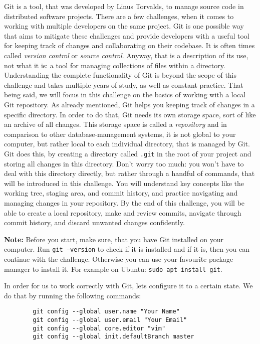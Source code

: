 \begin{challenge}
    \begin{chadescription}
    Git is a tool, that was developed by Linus Torvalds, to manage source code in distributed software projects.
    There are a few challenges, when it comes to working with multiple developers on the same project.
    Git is one possible way that aims to mitigate these challenges and provide developers with a useful tool for keeping track of changes and collaborating on their codebase.
    It is often times called \textit{version control} or \textit{source control}.
    Anyway, that is a description of its use, not what it is: a tool for managing collections of files within a directory.
    Understanding the complete functionality of Git is beyond the scope of this challenge and takes multiple years of study, as well as constant practice.
    That being said, we will focus in this challenge on the basics of working with a local Git repository.
    As already mentioned, Git helps you keeping track of changes in a specific directory.
    In order to do that, Git needs its own storage space, sort of like an archive of all changes. 
    This storage space is called a \textit{repository} and in comparison to other database-management systems, it is not global to your computer, but rather local to each individual directory, that is managed by Git.
    Git does this, by creating a directory called \texttt{.git} in the root of your project and storing all changes in this directory.
    Don't worry too much: you won't have to deal with this directory directly, but rather through a handful of commands, that will be introduced in this challenge.
    You will understand key concepts like the working tree, staging area, and commit history, and practice navigating and managing changes in your repository.
    By the end of this challenge, you will be able to create a local repository, make and review commits, navigate through commit history, and discard unwanted changes confidently.

    \textbf{Note:} Before you start, make sure, that you have Git installed on your computer.
    Run \texttt{git --version} to check if it is installed and if it is, then you can continue with the challenge.
    Otherwise you can use your favourite package manager to install it.
    For example on Ubuntu: \texttt{sudo apt install git}.
    \end{chadescription}

    \begin{task}
        In order for us to work correctly with Git, lets configure it to a certain state. 
        We do that by running the following commands:
        \begin{lstlisting}
        git config --global user.name "Your Name"
        git config --global user.email "Your Email"
        git config --global core.editor "vim"
        git config --global init.defaultBranch master
        \end{lstlisting}
    \end{task}


\end{challenge}
